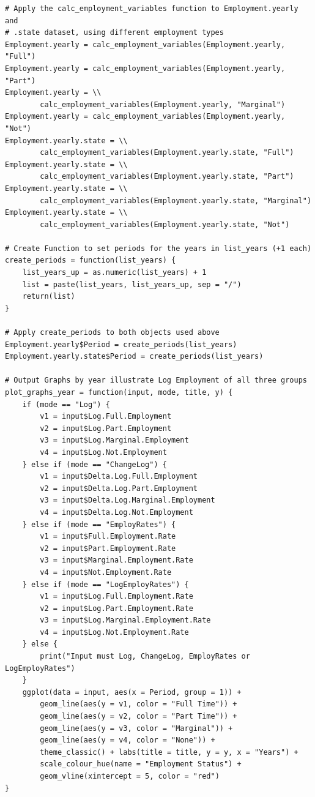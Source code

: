 \documentclass[a4paper]{article}
\begin{document}
{\begin{lstlisting}
# Apply the calc_employment_variables function to Employment.yearly and 
# .state dataset, using different employment types
Employment.yearly = calc_employment_variables(Employment.yearly, "Full")
Employment.yearly = calc_employment_variables(Employment.yearly, "Part")
Employment.yearly = \\ 
     	calc_employment_variables(Employment.yearly, "Marginal")
Employment.yearly = calc_employment_variables(Employment.yearly, "Not")
Employment.yearly.state = \\ 
     	calc_employment_variables(Employment.yearly.state, "Full")
Employment.yearly.state = \\ 
     	calc_employment_variables(Employment.yearly.state, "Part")
Employment.yearly.state = \\ 
     	calc_employment_variables(Employment.yearly.state, "Marginal")
Employment.yearly.state = \\ 
     	calc_employment_variables(Employment.yearly.state, "Not")

# Create Function to set periods for the years in list_years (+1 each)
create_periods = function(list_years) {
    list_years_up = as.numeric(list_years) + 1
    list = paste(list_years, list_years_up, sep = "/")
    return(list)
}

# Apply create_periods to both objects used above
Employment.yearly$Period = create_periods(list_years)
Employment.yearly.state$Period = create_periods(list_years)

# Output Graphs by year illustrate Log Employment of all three groups
plot_graphs_year = function(input, mode, title, y) {
    if (mode == "Log") {
        v1 = input$Log.Full.Employment
        v2 = input$Log.Part.Employment
        v3 = input$Log.Marginal.Employment
        v4 = input$Log.Not.Employment
    } else if (mode == "ChangeLog") {
        v1 = input$Delta.Log.Full.Employment
        v2 = input$Delta.Log.Part.Employment
        v3 = input$Delta.Log.Marginal.Employment
        v4 = input$Delta.Log.Not.Employment
    } else if (mode == "EmployRates") {
        v1 = input$Full.Employment.Rate
        v2 = input$Part.Employment.Rate
        v3 = input$Marginal.Employment.Rate
        v4 = input$Not.Employment.Rate
    } else if (mode == "LogEmployRates") {
        v1 = input$Log.Full.Employment.Rate
        v2 = input$Log.Part.Employment.Rate
        v3 = input$Log.Marginal.Employment.Rate
        v4 = input$Log.Not.Employment.Rate
    } else {
        print("Input must Log, ChangeLog, EmployRates or LogEmployRates")
    }
    ggplot(data = input, aes(x = Period, group = 1)) + 
    	geom_line(aes(y = v1, color = "Full Time")) + 
    	geom_line(aes(y = v2, color = "Part Time")) + 
        geom_line(aes(y = v3, color = "Marginal")) + 
        geom_line(aes(y = v4, color = "None")) + 
        theme_classic() + labs(title = title, y = y, x = "Years") + 
        scale_colour_hue(name = "Employment Status") + 
        geom_vline(xintercept = 5, color = "red")
}


\end{lstlisting}}
\end{document}
